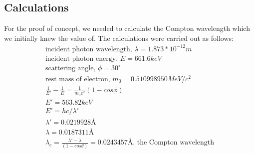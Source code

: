 	\subsection{Calculations}
		For the proof of concept, we needed to calculate the Compton wavelength which we initially knew the value of. The calculations were carried out as follows:
		\begin{align*}
			\text{incident photon wavelength, } \lambda = 1.873 * 10^{-12} m
			\\
			\text{incident photon energy, } E = 661.6 keV
			\\
			\text{scattering angle, } \phi = 30^\circ
			\\
			\text{rest mass of electron, } m_0 = 0.510998950 MeV / c^2
			\\
			\frac{1}{E'} - \frac{1}{E} = \frac{1}{m_0 c^2} (1 - cos \phi)
			\\
			E' = 563.82 keV
			\\
			E' = hc / \lambda'
			\\
			\lambda' = 0.0219928 \si{\angstrom}
			\\
			\lambda = 0.0187311 \si{\angstrom}
			\\
			\lambda_c = \frac{\lambda' - \lambda}{(1 - cos \theta)} = 0.0243457 \si{\angstrom} \text{, the Compton wavelength}
			\end{align*}
			